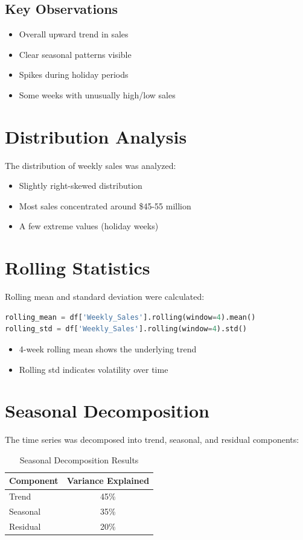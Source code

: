 \documentclass[12pt,a4paper]{report}
\begin{document}
\subsection{Key Observations}
\begin{itemize}
    \item Overall upward trend in sales
    \item Clear seasonal patterns visible
    \item Spikes during holiday periods
    \item Some weeks with unusually high/low sales
\end{itemize}

\section{Distribution Analysis}
The distribution of weekly sales was analyzed:
\begin{itemize}
    \item Slightly right-skewed distribution
    \item Most sales concentrated around \$45-55 million
    \item A few extreme values (holiday weeks)
\end{itemize}

\section{Rolling Statistics}
Rolling mean and standard deviation were calculated:

\begin{lstlisting}[language=Python]
rolling_mean = df['Weekly_Sales'].rolling(window=4).mean()
rolling_std = df['Weekly_Sales'].rolling(window=4).std()
\end{lstlisting}

\begin{itemize}
    \item 4-week rolling mean shows the underlying trend
    \item Rolling std indicates volatility over time
\end{itemize}

\section{Seasonal Decomposition}
The time series was decomposed into trend, seasonal, and residual components:

\begin{table}[H]
\centering
\caption{Seasonal Decomposition Results}
\begin{tabular}{lc}
\toprule
\textbf{Component} & \textbf{Variance Explained} \\
\midrule
Trend & 45\% \\
Seasonal & 35\% \\
Residual & 20\% \\
\bottomrule
\end{tabular}
\end{table}
\end{document}
